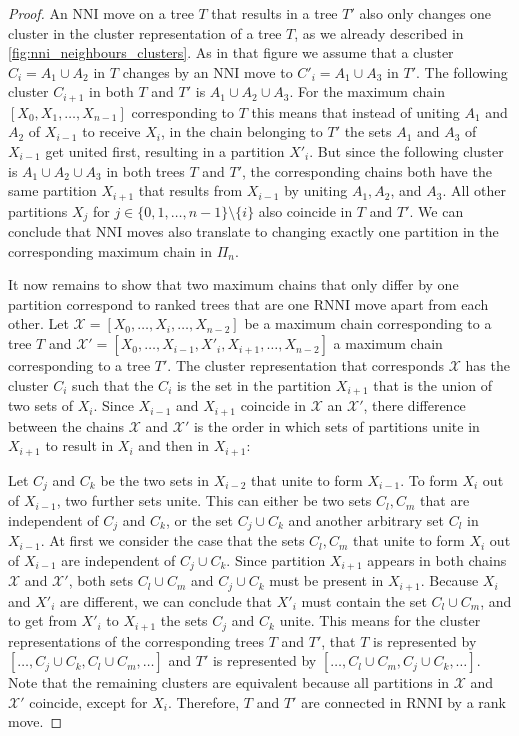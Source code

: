 \documentclass[11pt]{amsart}
\newcommand{\rnni}{\mathrm{RNNI}}
\newcommand{\nni}{\mathrm{NNI}}
\begin{document}
\begin{proof}
	An $\nni$ move on a tree $T$ that results in a tree $T'$ also only changes one cluster in the cluster representation of a tree $T$, as we already described in \autoref{fig:nni_neighbours_clusters}.
	As in that figure we assume that a cluster $C_i = A_1 \cup A_2$ in $T$ changes by an $\nni$ move to $C'_i = A_1 \cup A_3$ in $T'$.
	The following cluster $C_{i+1}$ in both $T$ and $T'$ is $A_1 \cup A_2 \cup A_3$.
	For the maximum chain $[X_0, X_1, \ldots, X_{n-1}]$ corresponding to $T$ this means that instead of uniting $A_1$ and $A_2$ of $X_{i-1}$ to receive $X_i$, in the chain belonging to $T'$ the sets $A_1$ and $A_3$ of $X_{i-1}$ get united first, resulting in a partition $X'_i$.
	But since the following cluster is $A_1 \cup A_2 \cup A_3$ in both trees $T$ and $T'$, the corresponding chains both have the same partition $X_{i+1}$ that results from $X_{i-1}$ by uniting $A_1, A_2$, and $A_3$.
	All other partitions $X_j$ for $j \in \{0,1,\ldots,n-1\}\setminus\{i\}$ also coincide in $T$ and $T'$.
	We can conclude that $\nni$ moves also translate to changing exactly one partition in the corresponding maximum chain in $\Pi_n$.

	It now remains to show that two maximum chains that only differ by one partition correspond to ranked trees that are one $\rnni$ move apart from each other.
	Let $\mathcal X = [X_0, \ldots, X_i, \ldots, X_{n-2}]$ be a maximum chain corresponding to a tree $T$ and $\mathcal X' = [X_0, \ldots, X_{i-1}, X'_i, X_{i+1}, \ldots, X_{n-2}]$ a maximum chain corresponding to a tree $T'$.
	The cluster representation that corresponds $\mathcal X$ has the cluster $C_i$ such that the $C_i$ is the set in the partition $X_{i+1}$ that is the union of two sets of $X_i$.
	Since $X_{i-1}$ and $X_{i+1}$ coincide in $\mathcal X$ an $\mathcal X'$, there difference between the chains $\mathcal X$ and $\mathcal X'$ is the order in which sets of partitions unite in $X_{i+1}$ to result in $X_i$ and then in $X_{i+1}$:

	Let $C_j$ and $C_k$ be the two sets in $X_{i-2}$ that unite to form $X_{i-1}$.
	To form $X_i$ out of $X_{i-1}$, two further sets unite.
	This can either be two sets $C_l, C_m$ that are independent of $C_j$ and $C_k$, or the set $C_j \cup C_k$ and another arbitrary set $C_l$ in $X_{i-1}$.
	At first we consider the case that the sets $C_l,C_m$ that unite to form $X_i$ out of $X_{i-1}$ are independent of $C_j \cup C_k$.
	Since partition $X_{i+1}$ appears in both chains $\mathcal X$ and $\mathcal X'$, both sets $C_l \cup C_m$ and $C_j \cup C_k$ must be present in $X_{i+1}$.
	Because $X_i$ and $X'_i$ are different, we can conclude that $X'_i$ must contain the set $C_l \cup C_m$, and to get from $X'_i$ to $X_{i+1}$ the sets $C_j$ and $C_k$ unite.
	This means for the cluster representations of the corresponding trees $T$ and $T'$, that $T$ is represented by $[\ldots, C_j \cup C_k, C_l \cup C_m, \ldots]$ and $T'$ is represented by $[\ldots, C_l \cup C_m, C_j \cup C_k, \ldots]$.
	Note that the remaining clusters are equivalent because all partitions in $\mathcal X$ and $\mathcal X'$ coincide, except for $X_i$.
	Therefore, $T$ and $T'$ are connected in $\rnni$ by a rank move.


\end{proof}
\end{document}
